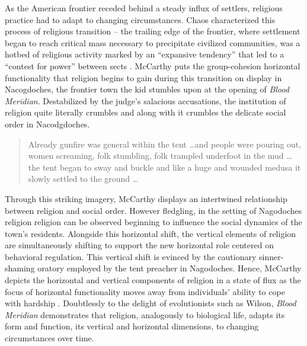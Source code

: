 As the American frontier receded behind a steady influx of settlers, religious practice had to adapt to changing circumstances.
Chaos characterized this process of religious transition -- the trailing edge of the frontier, where settlement began to reach critical mass necessary to precipitate civilized communities, was a hotbed of religious activity marked by an ``expansive tendency'' that led to a ``contest for power'' between sects  \cite{Turner1894TheHistory}.
McCarthy puts the group-cohesion horizontal functionality that religion begins to gain during this transition on display in Nacogdoches, the frontier town the kid stumbles upon at the opening of \textit{Blood Meridian}.
Destabilized by the judge's salacious accusations, the institution of religion quite literally crumbles and along with it crumbles the delicate social order in Nacodgdoches.
\blockcquote[p 7]{McCarthy1992BloodWest}{Already gunfire was general within the tent \ldots and people were pouring out, women screaming, folk stumbling, folk trampled underfoot in the mud \ldots the tent began to sway and buckle and like a huge and wounded medusa it slowly settled to the ground \ldots}. Through this striking imagery, McCarthy displays an intertwined relationship between religion and social order.
However fledgling, in the setting of Nagodoches religion religion can be observed beginning to influence the social dynamics of the town's residents.
Alongside this horizontal shift, the vertical elements of religion are simultaneously shifting to support the new horizontal role centered on behavioral regulation. This vertical shift is evinced by the cautionary sinner-shaming oratory employed by the tent preacher in Nagodoches. Hence, McCarthy depicts the horizontal and vertical components of religion in a state of flux as the focus of horizontal functionality moves away from individuals' ability to cope with hardship \cite[p 6]{McCarthy1992BloodWest}. Doubtlessly to the delight of evolutionists such as Wilson, \textit{Blood Meridian} demonstrates that religion, analogously to biological life, adapts its form and function, its vertical and horizontal dimensions, to changing circumstances over time.
